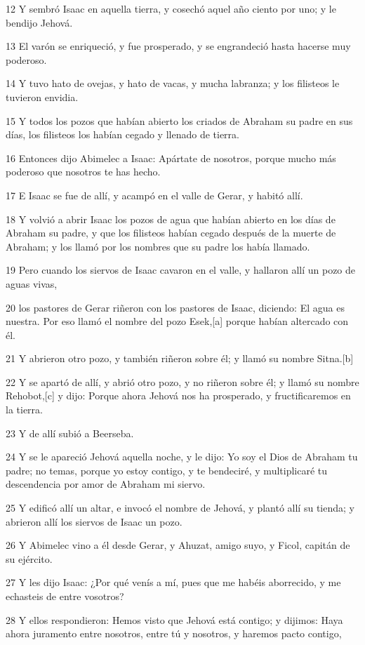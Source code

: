 12 Y sembró Isaac en aquella tierra, y cosechó aquel año ciento por uno; y le bendijo Jehová.

13 El varón se enriqueció, y fue prosperado, y se engrandeció hasta hacerse muy poderoso.

14 Y tuvo hato de ovejas, y hato de vacas, y mucha labranza; y los filisteos le tuvieron envidia.

15 Y todos los pozos que habían abierto los criados de Abraham su padre en sus días, los filisteos los habían cegado y llenado de tierra.

16 Entonces dijo Abimelec a Isaac: Apártate de nosotros, porque mucho más poderoso que nosotros te has hecho.

17 E Isaac se fue de allí, y acampó en el valle de Gerar, y habitó allí.

18 Y volvió a abrir Isaac los pozos de agua que habían abierto en los días de Abraham su padre, y que los filisteos habían cegado después de la muerte de Abraham; y los llamó por los nombres que su padre los había llamado.

19 Pero cuando los siervos de Isaac cavaron en el valle, y hallaron allí un pozo de aguas vivas,

20 los pastores de Gerar riñeron con los pastores de Isaac, diciendo: El agua es nuestra. Por eso llamó el nombre del pozo Esek,[a] porque habían altercado con él.

21 Y abrieron otro pozo, y también riñeron sobre él; y llamó su nombre Sitna.[b]

22 Y se apartó de allí, y abrió otro pozo, y no riñeron sobre él; y llamó su nombre Rehobot,[c] y dijo: Porque ahora Jehová nos ha prosperado, y fructificaremos en la tierra.

23 Y de allí subió a Beerseba.

24 Y se le apareció Jehová aquella noche, y le dijo: Yo soy el Dios de Abraham tu padre; no temas, porque yo estoy contigo, y te bendeciré, y multiplicaré tu descendencia por amor de Abraham mi siervo.

25 Y edificó allí un altar, e invocó el nombre de Jehová, y plantó allí su tienda; y abrieron allí los siervos de Isaac un pozo.

26 Y Abimelec vino a él desde Gerar, y Ahuzat, amigo suyo, y Ficol, capitán de su ejército.

27 Y les dijo Isaac: ¿Por qué venís a mí, pues que me habéis aborrecido, y me echasteis de entre vosotros?

28 Y ellos respondieron: Hemos visto que Jehová está contigo; y dijimos: Haya ahora juramento entre nosotros, entre tú y nosotros, y haremos pacto contigo,

